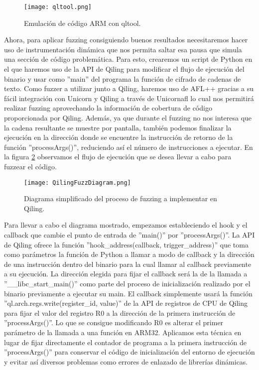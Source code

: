 \begin{figure}[H]
    \centering
    \texttt{[image: qltool.png]}
    \caption{Emulación de código ARM con qltool.}
    \label{fig:qltool}
\end{figure}

Ahora, para aplicar fuzzing consiguiendo buenos resultados necesitaremos hacer uso de instrumentación dinámica que nos permita saltar esa pausa que 
simula una sección de código problemática. Para esto, crearemos un script de Python en el que haremos uso de la API de Qiling para modificar
el flujo de ejecución del binario y usar como ''main'' del programa la función de cifrado de cadenas de texto. Como fuzzer a utilizar junto a Qiling, 
haremos uso de AFL++ gracias a su fácil integración con Unicorn y Qiling a través de Unicornafl lo cual nos permitirá realizar fuzzing aprovechando la 
información de cobertura de código proporcionada por Qiling. Además, ya que durante el fuzzing 
no nos interesa que la cadena resultante se muestre por pantalla, también podemos finalizar la ejecución en la dirección donde se encuentre la instrucción
de retorno de la función ''processArgs()'', reduciendo así el número de instrucciones a ejecutar. En la figura \ref{fig:QilingFuzzDiagram} observamos el
flujo de ejecución que se desea llevar a cabo para fuzzear el código.

\begin{figure}[H]
    \centering
    \texttt{[image: QilingFuzzDiagram.png]}
    \caption{Diagrama simplificado del proceso de fuzzing a implementar en Qiling.}
    \label{fig:QilingFuzzDiagram}
\end{figure}

Para llevar a cabo el diagrama mostrado, empezamos estableciendo el hook y el callback que cambie el punto de entrada de ''main()'' por ''processArgs()''.
La API de Qiling ofrece la función ''hook\_address(callback, trigger\_address)'' que toma como parámetros la función de Python a llamar a modo de callback 
y la dirección de una instrucción dentro del binario para la cual llamar al callback previamente a su ejecución. La dirección elegida para fijar el callback 
será la de la llamada a ''\_\_libc\_start\_main()'' como parte del proceso de inicialización realizado por el binario previamente a ejecutar su main. El callback
simplemente usará la función ''ql.arch.regs.write(register\_id, value)'' de la API de registros de CPU de Qiling para fijar el valor del registro R0 a la dirección de la primera 
instrucción de ''processArgs()''. Lo que se consigue modificando R0 es alterar el primer parámetro de la llamada a una función en ARM32. Aplicamos esta
técnica en lugar de fijar directamente el contador de programa a la primera instrucción de ''processArgs()'' para conservar el código 
de inicialización del entorno de ejecución y evitar así diversos problemas como errores de enlazado de librerías dinámicas.\bigskip

